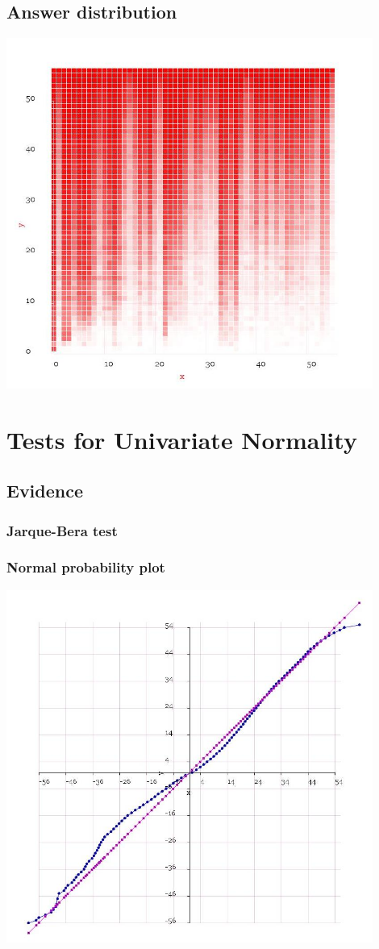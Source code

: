 \documentclass[10pt]{article}
\begin{document}
\subsection{Answer distribution}
\includegraphics[width=120mm]{ReportMedia/AnswerDistribution.jpg}

\newpage
\section{Tests for Univariate Normality}
\subsection{Evidence}
\subsubsection{Jarque-Bera test}
\subsubsection{Normal probability plot}
\includegraphics[width=120mm]{ReportMedia/NormalProbabilityPlotImprovement.jpg}
\end{document}
